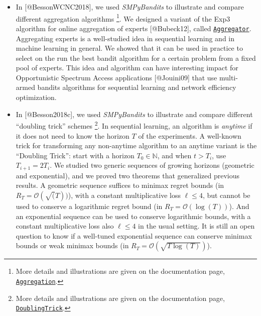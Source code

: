 \begin{itemize}
\tightlist
\item
  In {[}@BessonWCNC2018{]}, we used \emph{SMPyBandits} to illustrate and
  compare different aggregation algorithms \footnote{More details and
    illustrations are given on the documentation page,
    \href{https://smpybandits.github.io/Aggregation.html}{\texttt{Aggregation}}.}.
  We designed a variant of the Exp3 algorithm for online aggregation of
  experts {[}@Bubeck12{]}, called
  \href{https://smpybandits.github.io/docs/Policies.Aggregator.html}{\texttt{Aggregator}}.
  Aggregating experts is a well-studied idea in sequential learning and
  in machine learning in general. We showed that it can be used in
  practice to select on the run the best bandit algorithm for a certain
  problem from a fixed pool of experts. This idea and algorithm can have
  interesting impact for Opportunistic Spectrum Access applications
  {[}@Jouini09{]} that use multi-armed bandits algorithms for sequential
  learning and network efficiency optimization.
\end{itemize}

\begin{itemize}
\tightlist
\item
  In {[}@Besson2018c{]}, we used \emph{SMPyBandits} to illustrate and
  compare different ``doubling trick'' schemes \footnote{More details
    and illustrations are given on the documentation page,
    \href{https://smpybandits.github.io/DoublingTrick.html}{\texttt{DoublingTrick}}.}.
  In sequential learning, an algorithm is \emph{anytime} if it does not
  need to know the horizon \(T\) of the experiments. A well-known trick
  for transforming any non-anytime algorithm to an anytime variant is
  the ``Doubling Trick'': start with a horizon \(T_0\in\mathbb{N}\),
  and when \(t > T_i\), use \(T_{i+1} = 2 T_i\). We studied two generic
  sequences of growing horizons (geometric and exponential), and we
  proved two theorems that generalized previous results. A geometric
  sequence suffices to minimax regret bounds (in
  \(R_T = \mathcal{O}(\sqrt(T))\)), with a constant multiplicative loss
  \(\ell \leq 4\), but cannot be used to conserve a logarithmic regret
  bound (in \(R_T = \mathcal{O}(\log(T))\)). And an exponential sequence
  can be used to conserve logarithmic bounds, with a constant
  multiplicative loss also \(\ell \leq 4\) in the usual setting. It is
  still an open question to know if a well-tuned exponential sequence
  can conserve minimax bounds or weak minimax bounds (in
  \(R_T = \mathcal{O}(\sqrt{T \log(T)})\)).
\end{itemize}

